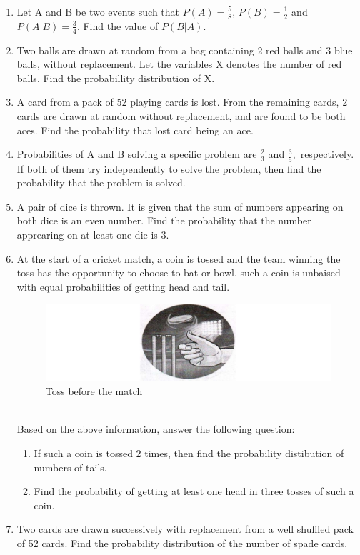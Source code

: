 \begin{enumerate}
\item Let A and B be two events such that $P(A) = \frac{5}{8}$, $P(B) = \frac{1}{2}$ and  $P(A|B) = \frac{3}{4}$. Find the value of $P(B|A)$.
\item Two balls are drawn at random from a bag containing 2 red balls and 3 blue balls, without replacement. Let the variables X denotes the number of red balls. Find the probabillity distribution of X.
\item A card from a pack of 52 playing cards is lost. From the remaining cards, 2 cards are drawn at random without replacement, and are found to be both aces. Find the probability that lost card being an ace.
\item Probabilities of A and B solving a specific problem are $\frac{2}{3}$ and $\frac{3}{5},$ respectively. If both of them try independently to solve the problem, then find the probability that the problem is  solved.
\item A pair of dice is thrown. It is given that the sum of numbers  appearing on both dice is an even number. Find the probability that the number apprearing on at least one die is 3.
\item At the start of a cricket match, a coin is tossed and the team winning the toss has the opportunity to choose to bat or bowl. such a coin is unbaised with equal probabilities of getting head and tail.
\begin{figure}[!ht]
\centering
\includegraphics[width=\columnwidth]{figs/coin}
\caption{Toss before the match}
\label{fig:coin1}
\end{figure}
\\ Based on the above information, answer the following question:
\begin{enumerate}
\item If such a coin is tossed 2 times, then find the probability distibution of numbers of tails.
\item Find the probability of getting at least one head in three tosses of such a coin.
\end{enumerate}
\item Two cards are drawn successively with replacement from a well shuffled pack of 52 cards. Find the probability distribution of the number of spade cards.

\end{enumerate}
